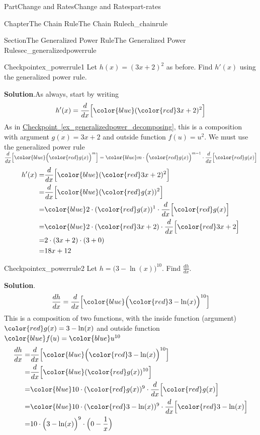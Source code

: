 \documentclass{tufte-book}
\newcommand{\blocktitlefont}{\relax}
\newcommand{\xreffont}{\relax}
\numberwithin{equation}{chapter}
\newcommand{\red}[1]{   {\color{red}   #1}   }
\newcommand{\blue}[1]{  {\color{blue}  #1}  }
\newcommand{\ddx}[1]{ \dfrac{d}{dx} \Big[ #1 \Big]  }
\newcommand{\amp}{&}
\begin{document}
\begin{partptx}{Part}{Change and Rates}{}{Change and Rates}{}{}{part-rates}
\begin{chapterptx}{Chapter}{The Chain Rule}{}{The Chain Rule}{}{}{ch_chainrule}
\begin{sectionptx}{Section}{The Generalized Power Rule}{}{The Generalized Power Rule}{}{}{sec_generalizedpowerrule}
\begin{inlineexercise}{Checkpoint}{}{ex_powerrule1}
Let \(h(x) = (3x+2)^2\) as before.  Find \(h'(x)\) using the generalized power rule.%
\par\smallskip%
\noindent\textbf{\blocktitlefont Solution}.\hypertarget{ex_powerrule1-2}{}\quad{}As always, start by writing%
\begin{equation*}
h'(x) = \ddx{ \blue{(\red{3x+2})^2} } 
\end{equation*}
As in \hyperref[ex_generalizedpower_decomposing]{Checkpoint~{\xreffont\ref{ex_generalizedpower_decomposing}}}, this is a composition with argument \(g(x) = 3x+2\) and outside function \(f(u) = u^2\). We must use the generalized power rule \(\ddx{ \blue{ \Big( \red{g(x)} \Big)^m}} = \blue{ m\cdot \Big( \red{g(x)} \Big)^{m-1} } \cdot \ddx{\red{g(x)}} \)%
\begin{align*}
h'(x) = \amp \ddx{ \blue{ ( \red{3x+2} )^2 } }\\
= \amp \ddx{\blue{ ( \red{g(x)} )^2 } } \\
= \amp \blue{ 2\cdot ( \red{g(x)} )^1 }\cdot \ddx{ \red{g(x)} }\\
= \amp \blue{2\cdot ( \red{3x+2} ) }\cdot \ddx{ \red{3x+2} }\\
= \amp 2\cdot (3x+2) \cdot (3+0)\\
= \amp 18x+12
\end{align*}
%
\end{inlineexercise}%
\begin{inlineexercise}{Checkpoint}{}{ex_powerrule2}%
Let \(h = \Big(3-\ln(x)\Big)^{10}\). Find \(\frac{dh}{dx}\).%
\par\smallskip%
\noindent\textbf{\blocktitlefont Solution}.\hypertarget{ex_powerrule2-2}{}\quad{}%
\begin{equation*}
\frac{dh}{dx} = \ddx{ \blue{ \Big( \red{3-\ln(x)}\Big)^{10} } } 
\end{equation*}
This is a composition of two functions, with the inside function (argument) \(\red{g(x) = 3-\ln(x)} \) and outside function \(\blue{f(u)} = \blue {u^{10}}\)%
\begin{align*}
\frac{dh}{dx} =  \amp \ddx{ \blue{ \Big( \red{3-\ln(x)}\Big)^{10} } } \\
= \amp \ddx{\blue{ ( \red{g(x)} )^{10} } } \\
= \amp \blue{ 10\cdot ( \red{g(x)} )^9 }\cdot \ddx{ \red{g(x)} }\\
= \amp \blue{10\cdot ( \red{3-\ln(x)} )^9 }\cdot \ddx{ \red{3-\ln(x)} }\\
= \amp 10\cdot \Big(3-\ln(x)\Big)^9\cdot \Big( 0 - \frac{1}{x}\Big)\\

\end{align*}
\end{inlineexercise}
\end{sectionptx}
\end{chapterptx}
\end{partptx}
\end{document}
